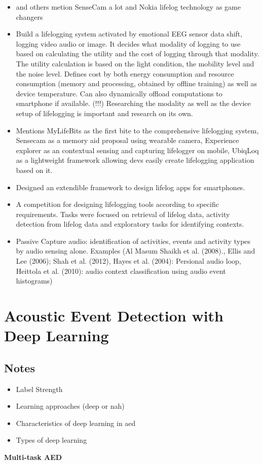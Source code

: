 \begin{itemize}
	\item \cite{gurrin2014lifelogging} and others metion SenseCam a lot and Nokia lifelog technology as game changers
	\item \cite{jiang2019memento} Build a lifelogging system activated by emotional EEG sensor data shift, logging video audio or image. It decides what modality of logging to use based on calculating the utility and the cost of logging through that modality. The utility calculation is based on the light condition, the mobility level and the noise level. Defines cost by both energy consumption and resource consumption (memory and processing, obtained by offline training) as well as device temperature. Can also dynamically offload computations to smartphone if available. (!!!) Researching the modality as well as the device setup of lifelogging is important and research on its own.
	\item \cite{jiang2019memento} Mentions MyLifeBits as the first bite to the comprehensive lifelogging system, Sensecam as a memory aid proposal using wearable camera, Experience explorer as an contextual sensing and capturing lifelogger on mobile, UbiqLoq as a lightweight framework allowing devs easily create lifelogging application based on it.
	\item \cite{rawassizadeh2013ubiqlog} Designed an extendible framework to design lifelog apps for smartphones. 
	\item \cite{gurrin2019overview} A competition for designing lifelogging tools according to specific requirements. Tasks were focused on retrieval of lifelog data, activity detection from lifelog data and exploratory tasks for identifying contexts.
	\item \cite{gurrin2014lifelogging} Passive Capture audio: identification of activities, events and activity types by audio sensing alone. Examples (Al Masum Shaikh et al. (2008)., Ellis and Lee (2006); Shah et al.
	(2012), Hayes et al. (2004): Persional audio loop, Heittola et al. (2010): audio context classification using audio event histograms)
\end{itemize}








\section{Acoustic Event Detection with Deep Learning}

\subsection{Notes}
\begin{itemize}
	\item Label Strength
	\item Learning approaches (deep or nah)
	\item Characteristics of deep learning in aed
	\item Types of deep learning
	
\end{itemize}

\textbf{Multi-task AED}








